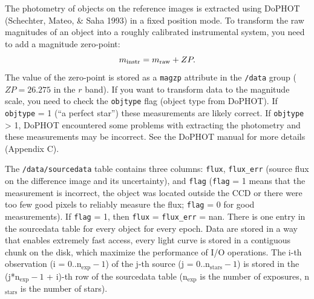 \documentclass[11pt]{article}
\begin{document}
\vspace{0.2cm}
The photometry of objects on the reference images is extracted using DoPHOT (Schechter, Mateo, \& Saha 1993) in a fixed position mode. To transform the raw magnitudes of an object into a roughly calibrated instrumental system, you need to add a magnitude zero-point:
$$
m_{\rm instr} = m_{\rm raw} + ZP.
$$
The value of the zero-point is stored as a \texttt{magzp} attribute in the \texttt{/data} group ($ZP=26.275$ in the $r$ band). If you want to transform data to the magnitude scale, you need to check the {\tt objtype} flag (object type from DoPHOT). If {\tt objtype} = 1 (``a perfect star'') these measurements are likely correct. If {\tt objtype} > 1, DoPHOT encountered some problems with extracting the photometry and these measurements may be incorrect. See the DoPHOT manual for more details (Appendix C).

\vspace{0.2cm}
The \texttt{/data/sourcedata} table contains three columns: {\tt flux}, {\tt flux\_err} (source flux on the difference image and its uncertainty), and {\tt flag} ({\tt flag} = 1 means that the measurement is incorrect, the object was located outside the CCD or there were too few good pixels to reliably measure the flux; {\tt flag} = 0 for good measurements). If {\tt flag} = 1, then {\tt flux} = {\tt flux\_err} = nan. There is one entry in the sourcedata table for every object for every epoch. Data are stored in a way that enables extremely fast access, every light curve is stored in a contiguous chunk on the disk, which maximize the performance of I/O operations. The i-th observation (i = 0..n$_{\mathrm{exp}}{-}1$) of the j-th source (j = 0..n$_{\mathrm{stars}}{-}1$) is stored in the (j*n$_{\mathrm{exp}}{-}1$ + i)-th row of the sourcedata table (n$_{\mathrm{exp}}$ is the number of exposures, n$_{\mathrm{stars}}$ is the number of stars).
\end{document}
